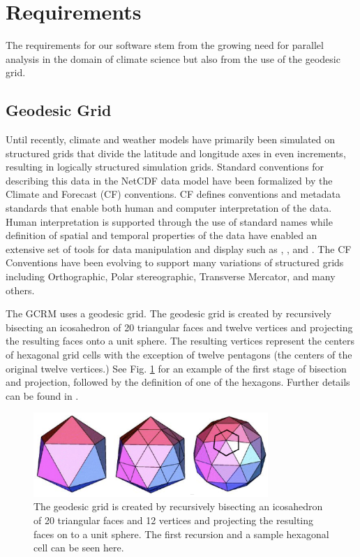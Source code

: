 \section{Requirements}
\label{section:requirements}

The requirements for our software stem from the growing need for parallel
analysis in the domain of climate science\cite{MODSIM07:LOT} but also from
the use of the geodesic grid.

\subsection{Geodesic Grid}
\label{subsection:grid}

Until recently, climate and weather models have primarily been simulated on
structured grids that divide the latitude and longitude axes in even
increments, resulting in logically structured simulation grids.  Standard
conventions for describing this data in the NetCDF data model have been
formalized by the Climate and Forecast (CF) conventions\cite{CF}.  CF defines
conventions and metadata standards that enable both human and computer
interpretation of the data.  Human interpretation is supported through the use
of standard names while definition of spatial and temporal properties of the
data have enabled an extensive set of tools for data manipulation and display
such as \cite{NCO}, \cite{OPeNDAP}, and \cite{FERRET}.  The CF Conventions
have been evolving to support many variations of structured grids including
Orthographic, Polar stereographic, Transverse Mercator, and many others. 

The GCRM uses a geodesic grid.  The geodesic grid is created by recursively
bisecting an icosahedron of 20 triangular faces and twelve vertices and
projecting the resulting faces onto a unit sphere.  The resulting vertices
represent the centers of hexagonal grid cells with the exception of twelve
pentagons (the centers of the original twelve vertices.) See Fig.
\ref{fig:geodesic} for an example of the first stage of bisection and
projection, followed by the definition of one of the hexagons.  Further
details can be found in \cite{GEODESIC}.

\begin{figure}[!t]
\center
\includegraphics[width=3.5in]{images/geodesic2}
\caption{The geodesic grid is created by recursively bisecting an icosahedron
of 20 triangular faces and 12 vertices and projecting the resulting faces on
to a unit sphere.  The first recursion and a sample hexagonal cell can be seen
here.}
\label{fig:geodesic}
\end{figure}

